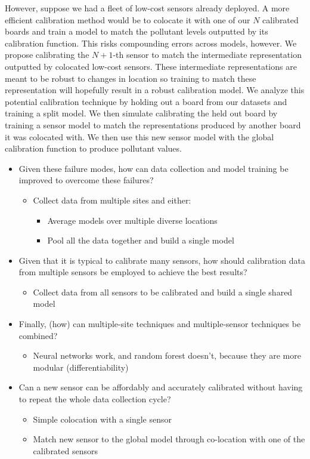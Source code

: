 \documentclass[journal abbreviation, manuscript]{copernicus}
\begin{document}
However, suppose we had a fleet of low-cost sensors already deployed. 
A more efficient calibration method would be to colocate it with one of our $N$ calibrated boards and train a model to match the pollutant levels outputted by its calibration function. This risks compounding errors across models, however. 
We propose calibrating the $N+1$-th sensor to match the intermediate representation outputted by colocated low-cost sensors. These intermediate representations are meant to be robust to changes in location so training to match these representation will hopefully result in a robust calibration model. We analyze this potential calibration technique by holding out a board from our datasets and training a split model. We then simulate calibrating the held out board by training a sensor model to match the representations produced by another board it was colocated with. We then use this new sensor model with the global calibration function to produce pollutant values.


\begin{itemize}
    \item Given these failure modes, how can data collection and model training be improved to overcome these failures?
      \begin{itemize}
          \item Collect data from multiple sites and either:
          \begin{itemize}
            \item Average models over multiple diverse locations 
            \item Pool all the data together and build a single model
          \end{itemize}
      \end{itemize}
    \item Given that it is typical to calibrate many sensors, how should calibration data from multiple sensors be employed to achieve the best results?
      \begin{itemize}
          \item Collect data from all sensors to be calibrated and build a single shared model
      \end{itemize}
    \item Finally, (how) can multiple-site techniques and multiple-sensor techniques be combined?
      \begin{itemize}
         \item Neural networks work, and random forest doesn’t, because they are more modular (differentiability)
      \end{itemize}
    \item Can a new sensor can be affordably and accurately calibrated without having to repeat the whole data collection cycle?
      \begin{itemize}
          \item Simple colocation with a single sensor
          \item Match new sensor to the global model through co-location with one of the calibrated sensors
      \end{itemize}
\end{itemize}
\end{document}
